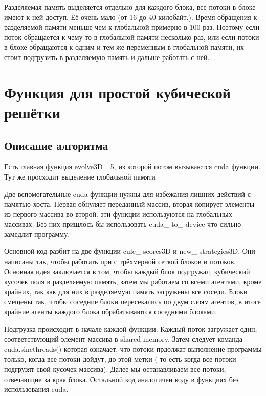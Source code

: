 \documentclass[a4paper,12pt]{article}
\begin{document}
Разделяемая память выделяется отдельно для каждого блока, все потоки в блоке имеют к ней доступ. Её очень мало (от 16 до 40 килобайт.). Время обращения к разделяемой памяти меньше чем к глобальной примерно в 100 раз. Поэтому если поток обращается к чему-то в глобальной памяти несколько раз, или если потоки в блоке обращаются к одним и тем же переменным в глобальной памяти, их стоит подгрузить в разделяемую память и дальше работать с ней.

\section{Функция для простой кубической решётки}

\subsection{Описание алгоритма}

Есть главная функция evolve3D\_ 5, из которой потом вызываются cuda функции. Тут же просходит выделение глобальной памяти %

Две вспомогательные cuda функции нужны для избежания лишних действий с памятью хоста. Первая обнуляет переданный массив, вторая копирует элементы из первого массива во второй. эти функции используются на глобальных массивах. Без них пришлось бы использовать cuda\_ to\_ device что сильно замедлит программу.

Основной код разбит на две функции culc\_ scores3D и new\_ strategies3D. Они написаны так, чтобы работать при с трёхмерной сеткой блоков и потоков. Основная идея заключается в том, чтобы каждый блок подгружал, кубический кусочек поля в разделяемую память, затем мы работаем со всеми агентами, кроме крайних, так как для них в разделяемую память загружены все соседи. Блоки смещены так, чтобы соседние блоки пересекались по двум слоям агентов, в итоге крайние агенты каждого блока обрабатываются соседними блоками.


Подгрузка происходит в начале каждой функции. Каждый поток загружает один, соответствующий элемент массива в shared memory. Затем следует команда cuda.sincthreads() которая означает, что потоки прдолжат выполнение программы только, когда все потоки дойдут, до этой метки ( то есть когда все потоки подгрузят свой кусочек массива). Далее мы останавливаем все потоки, отвечающие за края блока. Остальной код аналогичен коду в функциях без использования cuda.
\end{document}
